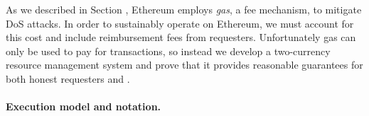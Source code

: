 
As we described in Section , Ethereum employs \emph{gas}, a fee mechanism, to mitigate DoS attacks.
In order to sustainably operate \tcs on Ethereum, we must account for this cost and include reimbursement fees from requesters.
Unfortunately gas can only be used to pay for transactions, so instead we develop a two-currency resource management system
and prove that it provides reasonable guarantees for both honest requesters and \tcs.


\paragraph{Execution model and notation.}

%
%
%
%

